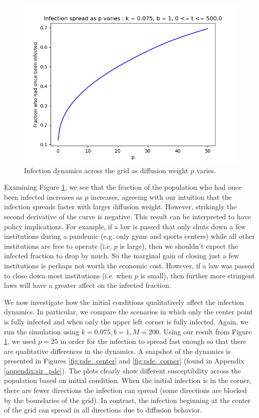 \documentclass[12pt, reqno]{amsart}
\begin{document}
    \begin{figure}[h!]
        \centering
        \includegraphics[scale=0.45]{infection_vs_p.png}
        \caption{Infection dynamics across the grid as diffusion weight \(p\) varies.}
        \label{fig:infection_vs_p}
    \end{figure}

    Examining Figure \ref{fig:infection_vs_p}, we see that the fraction of the population who had once been infected increases as \(p\) increases, agreeing with our intuition that the infection spreads faster with larger diffusion weight. However, strikingly the second derivative of the curve is negative. This result can be interpreted to have policy implications. For example, if a law is passed that only shuts down a few institutions during a pandemic (e.g. only gyms and sports centers) while all other institutions are free to operate (i.e. \(p\) is large), then we shouldn't expect the infected fraction to drop by much. So the marginal gain of closing just a few institutions is perhaps not worth the economic cost. However, if a law was passed to close down most institutions (i.e. when \(p\) is small), then further more stringent laws will have a greater affect on the infected fraction.
    
    We now investigate how the initial conditions qualitatively affect the infection dynamics. In particular, we compare the scenarios in which only the center point is fully infected and when only the upper left corner is fully infected. Again, we run the simulation using \(k = 0.075, b = 1, M = 200\). Using our result from Figure \ref{fig:infection_vs_p}, we used \( p = 25\) in order for the infection to spread fast enough so that there are qualitative differences in the dynamics. A snapshot of the dynamics is presented in Figures \ref{fig:pde_center} and \ref{fig:pde_corner} (found in Appendix \ref{appendix:sir_pde}). The plots clearly show different susceptibility across the population based on initial condition. When the initial infection is in the corner, there are fewer directions the infection can spread (some directions are blocked by the boundaries of the grid). In contrast, the infection beginning at the center of the grid can spread in all directions due to diffusion behavior. 
    
\end{document}

